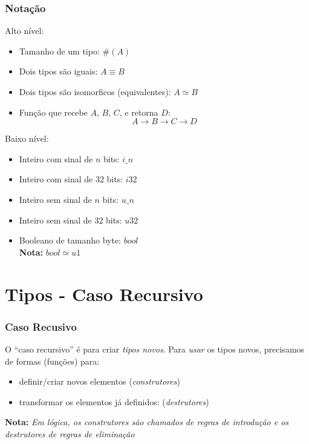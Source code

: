 \documentclass{beamer}
\newcommand{\nota}[1]{\textbf{Nota:}\textit{ #1}}
\newcommand{\typetam}{\#}
\newcommand{\typeeq}{\equiv}
\newcommand{\typesim}{\simeq}
\begin{document}
\begin{frame}
    \frametitle{Notação}
    Alto nível:
    \begin{itemize}
        \item Tamanho de um tipo: \(\typetam(A)\)
        \item Dois tipos são iguais: \( A \typeeq B \)
        \item Dois tipos são isomorficos (equivalentes):
            \( A \typesim B \)
        \item Função que recebe \(A\), \(B\), \(C\),
            e retorna \(D\): \[ A \to B \to C \to D \]
    \end{itemize}

    Baixo nível:
    \begin{itemize}
        \item Inteiro com sinal de \(n\) bits: \(i\_n\)
        \item Inteiro com sinal de \(32\) bits: \(i32\)
        \item Inteiro sem sinal de \(n\) bits: \(u\_n\)
        \item Inteiro sem sinal de \(32\) bits: \(u32\)
        \item Booleano de tamanho byte: \(bool\)
            \\\nota{\(bool \typesim u1\)}
    \end{itemize}
\end{frame}

\section{Tipos - Caso Recursivo}
\begin{frame}
    \frametitle{Caso Recusivo}
    O ``caso recursivo'' é para criar \emph{tipos novos}.
    \vfill
    Para \emph{usar} os tipos novos,
    precisamos de formas (funções) para:
    \begin{itemize}
        \item definir/criar novos elementos
            (\emph{construtores})
        \item transformar os elementos já definidos:
            (\emph{destrutores})
    \end{itemize}
    \vfill
    \nota{Em lógica, os \emph{construtores}
        são chamados de \emph{regras de introdução} e
        os \emph{destrutores}
        de \emph{regras de eliminação}}
\end{frame}
\end{document}
